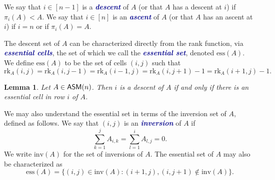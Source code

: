 \documentclass[12 pt]{amsart}
\newcommand{\newword}[1]{\textcolor{darkblue}{\textbf{\emph{#1}}}}
\newtheorem{lemma}[Theorem]{Lemma}
\numberwithin{equation}{section}
\newcommand{\rk}{\mathrm{rk}}
\newcommand{\ess}{\mathrm{ess}}
\newcommand{\inv}{\mathrm{inv}}
\theoremstyle{remark}
\newcommand{\asm}{{\sf ASM}}
\begin{document}
We say that $i \in [n-1]$ is a \newword{descent} of $A$ (or that $A$ has a descent at $i$) if $\pi_i(A)<A$.  We say that $i \in [n]$ is an \newword{ascent} of $A$ (or that $A$ has an ascent at $i$) if $i=n$ or if $\pi_i(A) = A$.

The descent set of $A$ can be characterized directly from the rank function, via \newword{essential cells}, the set of which we call the \newword{essential set}, denoted $\ess(A)$.  We define $\ess(A)$ to be the set of cells $(i,j)$ such that
\[
\rk_A(i,j)=\rk_A(i,j-1)=\rk_A(i-1,j)=\rk_A(i,j+1)-1=\rk_A(i+1,j)-1.
\]

\begin{lemma}{\cite[Lemma 3.2]{EKW-main}}\label{lemma:descentessential}
    Let $A\in\asm(n)$.  Then $i$ is a descent of $A$ if and only if there is an essential cell in row $i$ of $A$.
\end{lemma}



We may also understand the essential set in terms of the inversion set of $A$, defined as follows.  We say that $(i,j)$ is an \newword{inversion} of $A$ if 
\[\sum_{k=1}^jA_{i,k}=\sum_{l=1}^i A_{l,j}=0.\]
We write $\inv(A)$ for the set of inversions of $A$.  The essential set of $A$ may also be characterized as
\[
\ess(A)=\{(i,j)\in \inv(A) : (i + 1, j), (i, j + 1) \notin \inv(A)\}.
\]
\end{document}
